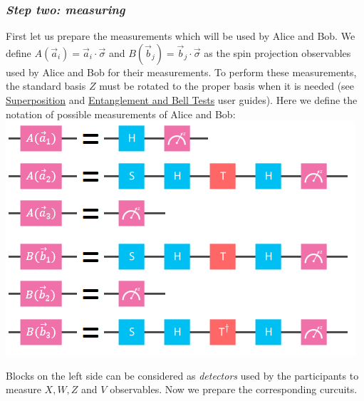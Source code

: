 \documentclass[11pt]{article}
\makeatletter
\def\maxwidth{\ifdim\Gin@nat@width>\linewidth\linewidth
    \else\Gin@nat@width\fi}
\let\Oldincludegraphics\includegraphics
\renewcommand{\includegraphics}[1]{\Oldincludegraphics[width=.8\maxwidth]{#1}}
\makeatother
\begin{document}
    \subsubsection{\texorpdfstring{\emph{Step two:
measuring}}{Step two: measuring}}\label{step-two-measuring}

    First let us prepare the measurements which will be used by Alice and
Bob. We define \(A(\vec{a}_i) = \vec{a}_i \cdot \vec{\sigma}\) and
\(B(\vec{b}_j) = \vec{b}_j \cdot \vec{\sigma}\) as the spin projection
observables used by Alice and Bob for their measurements. To perform
these measurements, the standard basis \(Z\) must be rotated to the
proper basis when it is needed (see
\href{https://quantumexperience.ng.bluemix.net/proxy/tutorial/full-user-guide/002-The_Weird_and_Wonderful_World_of_the_Qubit/020-Superposition.html}{Superposition}
and
\href{https://quantumexperience.ng.bluemix.net/proxy/tutorial/full-user-guide/003-Multiple_Qubits_Gates_and_Entangled_States/050-Entanglement_and_Bell_Tests.html}{Entanglement
and Bell Tests} user guides). Here we define the notation of possible
measurements of Alice and Bob: \includegraphics{images/bases.png}

    Blocks on the left side can be considered as \emph{detectors} used by
the participants to measure \(X, W, Z\) and \(V\) observables. Now we
prepare the corresponding curcuits.
\end{document}
